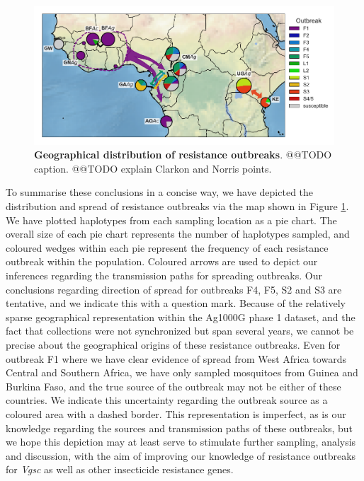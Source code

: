 \documentclass[a4paper,11pt,abstracton,hidelinks]{scrartcl}
\begin{document}
%
\begin{figure}[!b]
  \includegraphics[width=1.1\linewidth,center]{artwork/outbreak_map_edited.pdf}
  \caption{\textbf{Geographical distribution of resistance outbreaks}. @@TODO caption. @@TODO explain Clarkon and Norris points.}
  \label{fig:map}
\end{figure}


%
To summarise these conclusions in a concise way, we have depicted the distribution and spread of resistance outbreaks via the map shown in Figure \ref{fig:map}.
%
We have plotted haplotypes from each sampling location as a pie chart.
%
The overall size of each pie chart represents the number of haplotypes sampled, and coloured wedges within each pie represent the frequency of each resistance outbreak within the population.
%
Coloured arrows are used to depict our inferences regarding the transmission paths for spreading outbreaks.
%
Our conclusions regarding direction of spread for outbreaks F4, F5, S2 and S3 are tentative, and we indicate this with a question mark. 
%
Because of the relatively sparse geographical representation within the Ag1000G phase 1 dataset, and the fact that collections were not synchronized but span several years, we cannot be precise about the geographical origins of these resistance outbreaks.
%
Even for outbreak F1 where we have clear evidence of spread from West Africa towards Central and Southern Africa, we have only sampled mosquitoes from Guinea and Burkina Faso, and the true source of the outbreak may not be either of these countries.
%
We indicate this uncertainty regarding the outbreak source as a coloured area with a dashed border.
%
This representation is imperfect, as is our knowledge regarding the sources and transmission paths of these outbreaks, but we hope this depiction may at least serve to stimulate further sampling, analysis and discussion, with the aim of improving our knowledge of resistance outbreaks for \textit{Vgsc} as well as other insecticide resistance genes.
\end{document}
